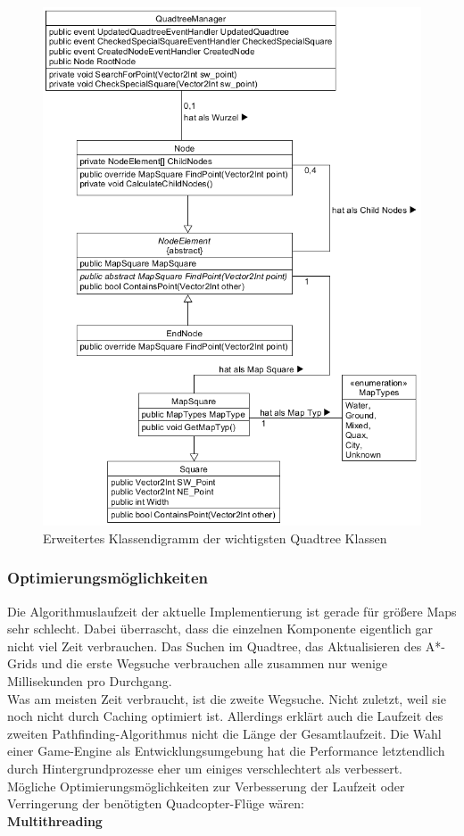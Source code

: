 \documentclass[a4paper,12pt]{article}
\begin{document}
\begin{figure}[H]
    \centering
    \includegraphics[width=1\linewidth]{Bilder/Aufgabe3/Teilaufgabe_C/Klassendiagramm_Quadtree.png}
    \caption{Erweitertes Klassendigramm der wichtigsten Quadtree Klassen}
\end{figure}

\subsubsection{Optimierungsmöglichkeiten}
Die Algorithmuslaufzeit der aktuelle Implementierung ist gerade für größere Maps sehr schlecht. Dabei überrascht, dass die einzelnen Komponente eigentlich gar nicht viel Zeit verbrauchen. Das Suchen im Quadtree, das Aktualisieren des A*-Grids und die erste Wegsuche verbrauchen alle zusammen nur wenige Millisekunden pro Durchgang. 
\\[0.4cm]
Was am meisten Zeit verbraucht, ist die zweite Wegsuche. Nicht zuletzt, weil sie noch nicht durch Caching optimiert ist. Allerdings erklärt auch die Laufzeit des zweiten Pathfinding-Algorithmus nicht die Länge der Gesamtlaufzeit. Die Wahl einer Game-Engine als Entwicklungsumgebung hat die Performance letztendlich durch Hintergrundprozesse eher um einiges verschlechtert als verbessert.
\\[0.4cm]
Mögliche Optimierungsmöglichkeiten zur Verbesserung der Laufzeit oder Verringerung der benötigten Quadcopter-Flüge wären:
\\[0.4cm]
\textbf{Multithreading}
\end{document}

